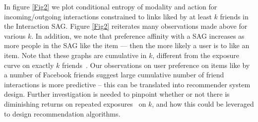 
In figure \ref{Fig2} we plot conditional entropy of modality and
action for incoming/outgoing interactions constrained to links
liked by at least $k$ friends in the Interaction SAG.  Figure \ref{Fig2} reiterates
many observations made above for various $k$.  In addition, we note that
preference affinity with a SAG increases as more people in the SAG
like the item --- then the more likely a user is to like an item.
Note that these graphs are cumulative in $k$, different from the 
exposure curve on exactly $k$ friends~\cite{Romero2011hashtag}. 
Our observations on user preference on items like by a number of Facebook friends 
suggest large cumulative number of friend interactions is more predictive 
-- this can be translated into recommender system design. 
Further investigation is needed to pinpoint whether or not there is 
diminishing returns on repeated exposures~\cite{ver2011stops,Romero2011hashtag} on $k$, 
and how this could be leveraged to design recommendation algorithms.


